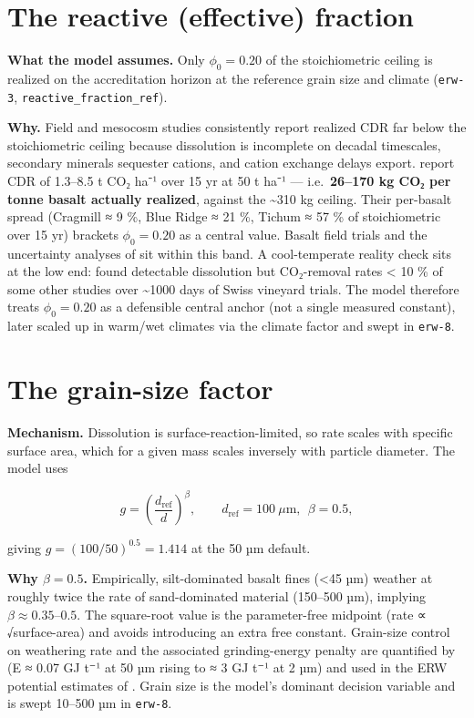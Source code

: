 \documentclass[openany]{book}
\begin{document}
\chapter{The reactive (effective) fraction}\label{ch:reactive}

\textbf{What the model assumes.} Only \(\phi_0 = 0.20\) of the stoichiometric
ceiling is realized on the accreditation horizon at the reference grain size and
climate (\texttt{erw-3}, \texttt{reactive\_fraction\_ref}).

\textbf{Why.} Field and mesocosm studies consistently report realized CDR far
below the stoichiometric ceiling because dissolution is incomplete on decadal
timescales, secondary minerals sequester cations, and cation exchange delays
export. \citet{lewis2021} report CDR of 1.3--8.5 t CO₂ ha⁻¹ over 15 yr at 50 t
ha⁻¹ --- i.e.~\textbf{26--170 kg CO₂ per tonne basalt actually realized},
against the \textasciitilde310 kg ceiling. Their per-basalt spread (Cragmill ≈ 9
\%, Blue Ridge ≈ 21 \%, Tichum ≈ 57 \% of stoichiometric over 15 yr) brackets
\(\phi_0=0.20\) as a central value. Basalt field trials
\citep{kantola2023, larkin2022} and the uncertainty analyses of
\citet{reershemius2024} sit within this band. A cool-temperate reality check
sits at the low end: \citet{dupla2025} found detectable dissolution but
CO₂-removal rates \textless{} 10 \% of some other studies over
\textasciitilde1000 days of Swiss vineyard trials. The model therefore treats
\(\phi_0=0.20\) as a defensible central anchor (not a single measured constant),
later scaled up in warm/wet climates via the climate factor and swept in
\texttt{erw-8}.

\chapter{The grain-size factor}\label{ch:grain}

\textbf{Mechanism.} Dissolution is surface-reaction-limited, so rate scales with
specific surface area, which for a given mass scales inversely with particle
diameter. The model uses

\[
g = \left(\frac{d_{\text{ref}}}{d}\right)^{\beta},
\qquad d_{\text{ref}}=100\ \mu\text{m},\ \ \beta=0.5,
\]

giving \(g=(100/50)^{0.5}=\mathbf{1.414}\) at the 50 µm default.

\textbf{Why \(\beta=0.5\).} Empirically, silt-dominated basalt fines
(\textless45 µm) weather at roughly twice the rate of sand-dominated material
(150--500 µm), implying \(\beta\approx0.35\)--\(0.5\). The square-root value is
the parameter-free midpoint (rate ∝ √surface-area) and avoids introducing an
extra free constant. Grain-size control on weathering rate and the associated
grinding-energy penalty are quantified by \citet{strefler2018} (E ≈ 0.07 GJ t⁻¹
at 50 µm rising to ≈ 3 GJ t⁻¹ at 2 µm) and used in the ERW potential estimates
of \citet{beerling2020}. Grain size is the model's dominant decision variable
and is swept 10--500 µm in \texttt{erw-8}.
\end{document}

